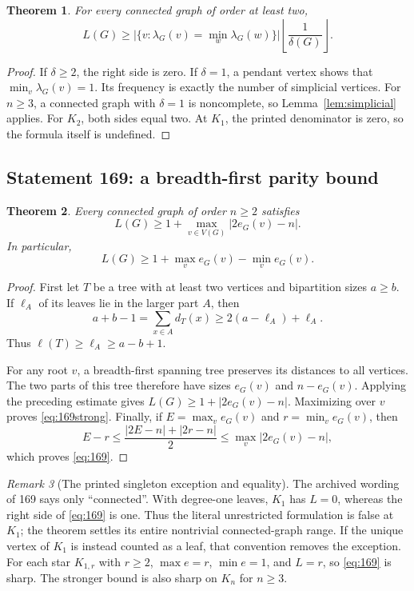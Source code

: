 \documentclass[11pt,a4paper]{article}
\newtheorem{theorem}{Theorem}[section]
\theoremstyle{remark}
\newtheorem{remark}[theorem]{Remark}
\begin{document}
\begin{theorem}\label{thm:162}
For every connected graph of order at least two,
\begin{equation}\label{eq:162}
L(G)\ge
\bigl|\{v:\lambda_G(v)=\min_w\lambda_G(w)\}\bigr|
\left\lfloor\frac1{\delta(G)}\right\rfloor.
\end{equation}
\end{theorem}
\begin{proof}
If $\delta\ge2$, the right side is zero. If $\delta=1$, a pendant
vertex shows that $\min_v\lambda_G(v)=1$. Its frequency is exactly the
number of simplicial vertices. For $n\ge3$, a connected graph with
$\delta=1$ is noncomplete, so Lemma~\ref{lem:simplicial} applies.
For $K_2$, both sides equal two. At $K_1$, the printed denominator is zero,
so the formula itself is undefined.
\end{proof}

\subsection{Statement 169: a breadth-first parity bound}

\begin{theorem}\label{thm:169}
Every connected graph of order $n\ge2$ satisfies
\begin{equation}\label{eq:169strong}
\boxed{L(G)\ge1+\max_{v\in V(G)}|2e_G(v)-n|.}
\end{equation}
In particular,
\begin{equation}\label{eq:169}
L(G)\ge1+\max_v e_G(v)-\min_v e_G(v).
\end{equation}
\end{theorem}
\begin{proof}
First let $T$ be a tree with at least two vertices and bipartition sizes
$a\ge b$. If $\ell_A$ of its leaves lie in the larger part $A$, then
\[
a+b-1=\sum_{x\in A}d_T(x)\ge2(a-\ell_A)+\ell_A.
\]
Thus $\ell(T)\ge\ell_A\ge a-b+1$.

For any root $v$, a breadth-first spanning tree preserves its distances
to all vertices. The two parts of this tree therefore have sizes
$e_G(v)$ and $n-e_G(v)$. Applying the preceding estimate gives
$L(G)\ge1+|2e_G(v)-n|$. Maximizing over $v$ proves
\eqref{eq:169strong}. Finally, if $E=\max_v e_G(v)$ and
$r=\min_v e_G(v)$, then
\[
E-r\le\frac{|2E-n|+|2r-n|}{2}
\le\max_v|2e_G(v)-n|,
\]
which proves \eqref{eq:169}.
\end{proof}

\begin{remark}[The printed singleton exception and equality]
The archived wording of 169 says only ``connected''. With degree-one
leaves, $K_1$ has $L=0$, whereas the right side of \eqref{eq:169} is one.
Thus the literal unrestricted formulation is false at $K_1$; the theorem
settles its entire nontrivial connected-graph range. If the unique vertex
of $K_1$ is instead counted as a leaf, that convention removes the exception.
For each star $K_{1,r}$ with $r\ge2$, $\max e=r$, $\min e=1$, and
$L=r$, so \eqref{eq:169} is sharp. The stronger bound is also sharp on
$K_n$ for $n\ge3$.
\end{remark}
\end{document}
